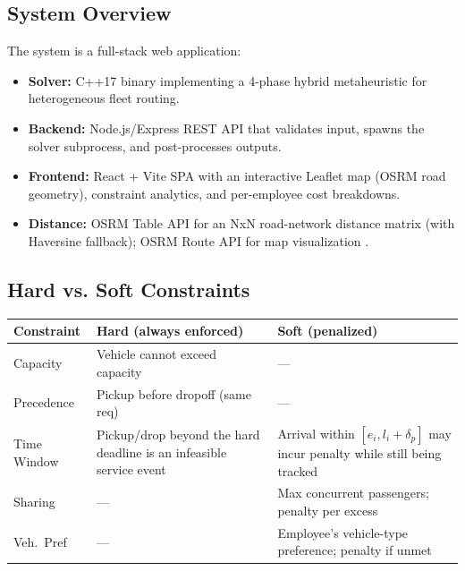 \documentclass[11pt,a4paper]{article}
\begin{document}
\vspace{4pt}
\subsection*{System Overview}
The system is a full-stack web application:
\begin{itemize}[leftmargin=16pt,itemsep=2pt]
  \item \textbf{Solver:} C++17 binary implementing a 4-phase hybrid metaheuristic for heterogeneous fleet routing.
  \item \textbf{Backend:} Node.js/Express REST API that validates input, spawns the solver subprocess, and post-processes outputs.
  \item \textbf{Frontend:} React + Vite SPA with an interactive Leaflet map (OSRM road geometry), constraint analytics, and per-employee cost breakdowns.
  \item \textbf{Distance:} OSRM Table API for an NxN road-network distance matrix (with Haversine fallback); OSRM Route API for map visualization \cite{osrm2023}.
\end{itemize}

\subsection*{Hard vs. Soft Constraints}
\begin{center}
\small
\begin{tabularx}{0.96\textwidth}{@{}p{}XX@{}}
\toprule
\rowcolor{rowhead}\color{white}\textbf{Constraint} & \color{white}\textbf{Hard (always enforced)} & \color{white}\textbf{Soft (penalized)} \\
\midrule
\rowcolor{rowalt}Capacity   & Vehicle cannot exceed capacity  & --- \\
Precedence  & Pickup before dropoff (same req) & --- \\
\rowcolor{rowalt}Time Window & \small Pickup/drop beyond the hard deadline is an infeasible service event & \small Arrival within $[e_i, l_i + \delta_p]$ may incur penalty while still being tracked \\
Sharing     & ---                             & \small Max concurrent passengers; penalty per excess \\
\rowcolor{rowalt}Veh.\ Pref & ---                            & \small Employee's vehicle-type preference; penalty if unmet \\
\bottomrule
\end{tabularx}
\end{center}
\end{document}
